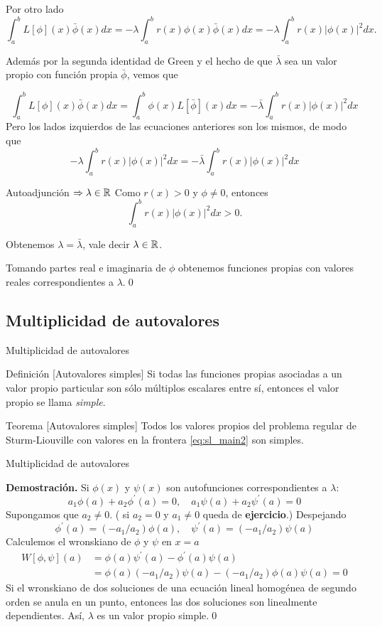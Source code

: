 Por otro lado
$$\int_{a}^{b} L[\phi](x) \bar{\phi}(x) d x=-\lambda \int_{a}^{b} r(x) \phi(x) \bar{\phi}(x) d x=-\lambda \int_{a}^{b} r(x)|\phi(x)|^{2} d x.$$


Además por la segunda identidad de Green y el hecho de que $\bar{\lambda}$ sea un valor propio con función propia $\bar{\phi}$, vemos que


$$
\int_{a}^{b} L[\phi](x) \bar{\phi}(x) d x=\int_{a}^{b} \phi(x) L[\bar{\phi}](x) d x=-\bar{\lambda} \int_{a}^{b} r(x)|\phi(x)|^{2} d x
$$
Pero los lados izquierdos de las ecuaciones anteriores son los mismos, de modo que 
$$
-\lambda \int_{a}^{b} r(x)|\phi(x)|^{2} d x=-\bar{\lambda} \int_{a}^{b} r(x)|\phi(x)|^{2} d x
$$




{Autoadjunción $\Rightarrow \lambda\in\rr$}
Como $r(x)>0$ y $\phi\neq 0$, entonces 
$$\int_{a}^{b} r(x)|\phi(x)|^{2} d x>0.$$ 

Obtenemos $\lambda=\bar{\lambda}$, vale decir $\lambda\in\rr$. 

Tomando partes real e imaginaria de  $\phi$ obtenemos  funciones propias con valores reales correspondientes a $\lambda$.\qed 


\subsection{Multiplicidad de autovalores}

{Multiplicidad de autovalores}


\begin{block}{Definición [Autovalores simples]} Si todas las funciones propias asociadas a un valor propio particular son sólo múltiplos escalares entre sí, entonces el valor propio se llama \emph{simple}.
\end{block}


\begin{block}{Teorema [Autovalores simples]}
Todos los valores propios del problema regular de Sturm-Liouville con valores en la frontera \eqref{eq:sl_main2} son simples.
\end{block}



{Multiplicidad de autovalores}

\textbf{Demostración.} Si $\phi(x)$ y $\psi(x)$ son autofunciones  correspondientes a $\lambda$: 
$$
a_{1} \phi(a)+a_{2} \phi^{\prime}(a)=0, \quad a_{1} \psi(a)+a_{2} \psi^{\prime}(a)=0
$$
Supongamos que $a_{2} \neq 0$. ( si $a_{2}=0$ y $a_{1} \neq 0$ queda de \textbf{ejercicio}.) Despejando
$$
\phi^{\prime}(a)=\left(-a_{1} / a_{2}\right) \phi(a), \quad \psi^{\prime}(a)=\left(-a_{1} / a_{2}\right) \psi(a)
$$
Calculemos el wronskiano de $\phi$ y $\psi$ en $x=a$
$$
\begin{aligned}
W[\phi, \psi](a) &=\phi(a) \psi^{\prime}(a)-\phi^{\prime}(a) \psi(a) \\
&=\phi(a)\left(-a_{1} / a_{2}\right) \psi(a)-\left(-a_{1} / a_{2}\right) \phi(a) \psi(a)=0
\end{aligned}
$$
Si el wronskiano de dos soluciones de una ecuación lineal homogénea de segundo orden se anula en un punto, entonces las dos soluciones son linealmente dependientes. Así, $\lambda$ es un valor propio simple.\qed



